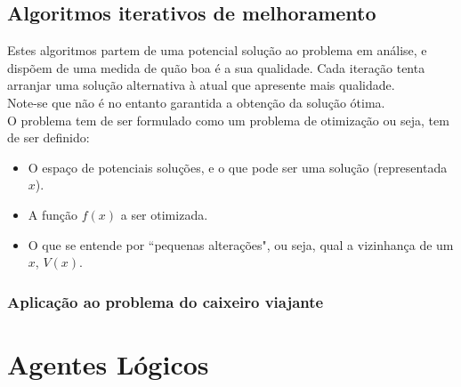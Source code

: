 \documentclass[]{report}
\begin{document}
\section{Algoritmos iterativos de melhoramento}
Estes algoritmos partem de uma potencial solução ao problema em análise, e dispõem de uma medida de quão boa é a sua qualidade. Cada iteração tenta arranjar uma solução alternativa à atual que apresente mais qualidade.\\
Note-se que não é no entanto garantida a obtenção da solução ótima.\\[5mm]
O problema tem de ser formulado como um problema de otimização ou seja, tem de ser definido:
\begin{itemize}
\item O espaço de potenciais soluções, e o que pode ser uma solução (representada $x$).
\item A função $f(x)$ a ser otimizada.
\item O que se entende por ``pequenas alterações", ou seja, qual a vizinhança de um $x$, $V(x)$.
\end{itemize}
\subsection{Aplicação ao problema do caixeiro viajante}
\chapter{Agentes Lógicos}
\end{document}
